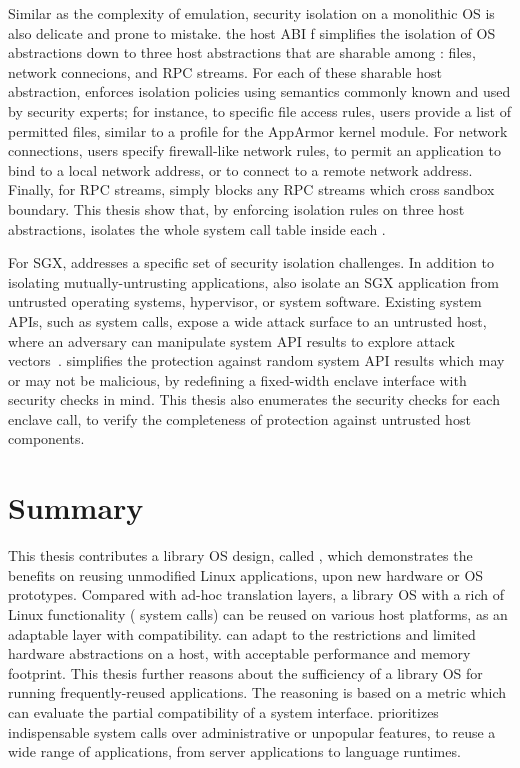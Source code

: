 Similar as the complexity of emulation,
security isolation on a monolithic OS is also delicate and prone to mistake.
the host ABI f \graphene{} simplifies the isolation of OS abstractions
down to three host abstractions that are sharable among \picoprocs{}: files, network connecions, and RPC streams.
For each of these sharable host abstraction, \graphene{} enforces isolation policies using semantics
commonly known and used by security experts;
for instance, to specific file access rules, users provide a list of permitted files, similar to a profile for the AppArmor kernel module.
For network connections,
users specify firewall-like network rules,
to permit an application
to bind to a local network address, or to connect to a remote network address.
Finally, for RPC streams,
\graphene{} simply blocks any RPC streams
which cross sandbox boundary.
This thesis show that,
by enforcing isolation rules on three host abstractions,
\thehostabi{} isolates the whole system call table inside each \picoproc{}.



For SGX, \graphene{} addresses a specific set of security isolation challenges.
In addition to isolating mutually-untrusting applications,
\graphene{} also isolate an SGX application
from untrusted operating systems, hypervisor, or system software.
Existing system APIs, such as system calls, expose a wide attack surface
to an untrusted host, where an adversary
can manipulate system API results to explore attack vectors~\cite{checkoway13iago}.
\graphene{} simplifies
the protection against random system API results which may or may not be malicious,
by redefining a fixed-width enclave interface
with security checks in mind.
This thesis also enumerates the security checks for each enclave call,
to verify the completeness
of protection against untrusted host components.









\section{Summary}

This thesis contributes a library OS design, called \graphene{},
which demonstrates the benefits on reusing unmodified Linux applications, upon new hardware or OS prototypes.
Compared with ad-hoc translation layers,
a library OS with a rich of Linux functionality (\graphenesyscallnum{} system calls) can be reused on various host platforms, as an adaptable layer with compatibility.
\graphene{} can adapt to the restrictions and
limited hardware abstractions on a host, with acceptable performance and memory footprint.
This thesis further reasons about the sufficiency of a library OS
for running frequently-reused applications. The reasoning is based on a metric which can evaluate the partial compatibility of a system interface.
\graphene{} prioritizes indispensable system calls over administrative or unpopular features,
to reuse a wide range of applications, from server applications to language runtimes.


